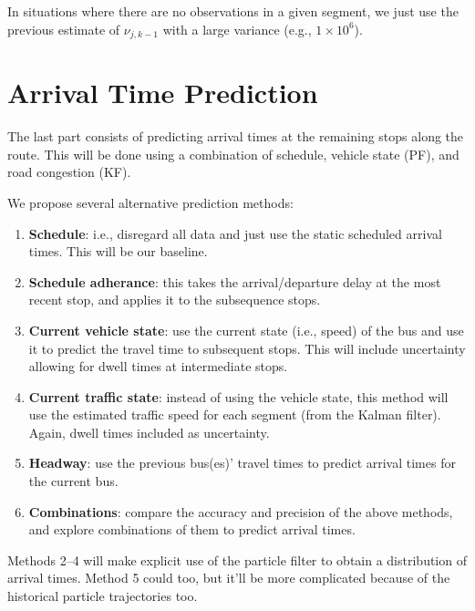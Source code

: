 \documentclass[14paper,twoside]{article}
\begin{document}
In situations where there are no observations in a given segment, 
we just use the previous estimate of $\nu_{j,k-1}$ with a large variance (e.g., $1\times 10^6$).



\section{Arrival Time Prediction}
\label{sec:arrival-time-pred}

The last part consists of predicting arrival times at the remaining stops along the route.
This will be done using a combination of schedule, vehicle state (PF),
and road congestion (KF).


We propose several alternative prediction methods:
\begin{enumerate}
\item \textbf{Schedule}: i.e., disregard all data and just use the static scheduled arrival times.
  This will be our baseline.

\item \textbf{Schedule adherance}: this takes the arrival/departure delay at the most recent stop,
  and applies it to the subsequence stops.

\item \textbf{Current vehicle state}: use the current state (i.e., speed) of the bus and use it to 
  predict the travel time to subsequent stops.
  This will include uncertainty allowing for dwell times at intermediate stops.

\item \textbf{Current traffic state}: instead of using the vehicle state, this method will use the 
  estimated traffic speed for each segment (from the Kalman filter).
  Again, dwell times included as uncertainty.

\item \textbf{Headway}: use the previous bus(es)' travel times to predict arrival times for the current bus.

\item \textbf{Combinations}: compare the accuracy and precision of the above methods,
  and explore combinations of them to predict arrival times.
\end{enumerate}

Methods 2--4 will make explicit use of the particle filter to obtain a distribution of arrival times.
Method 5 could too, but it'll be more complicated because of the historical particle trajectories too.
\end{document}
